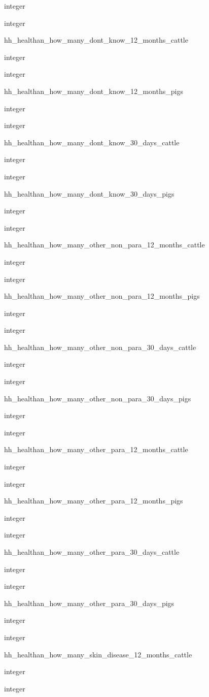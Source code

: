 \documentclass[]{article}
\begin{document}
integer

integer

hh\_healthan\_how\_many\_dont\_know\_12\_months\_cattle

integer

integer

hh\_healthan\_how\_many\_dont\_know\_12\_months\_pigs

integer

integer

hh\_healthan\_how\_many\_dont\_know\_30\_days\_cattle

integer

integer

hh\_healthan\_how\_many\_dont\_know\_30\_days\_pigs

integer

integer

hh\_healthan\_how\_many\_other\_non\_para\_12\_months\_cattle

integer

integer

hh\_healthan\_how\_many\_other\_non\_para\_12\_months\_pigs

integer

integer

hh\_healthan\_how\_many\_other\_non\_para\_30\_days\_cattle

integer

integer

hh\_healthan\_how\_many\_other\_non\_para\_30\_days\_pigs

integer

integer

hh\_healthan\_how\_many\_other\_para\_12\_months\_cattle

integer

integer

hh\_healthan\_how\_many\_other\_para\_12\_months\_pigs

integer

integer

hh\_healthan\_how\_many\_other\_para\_30\_days\_cattle

integer

integer

hh\_healthan\_how\_many\_other\_para\_30\_days\_pigs

integer

integer

hh\_healthan\_how\_many\_skin\_disease\_12\_months\_cattle

integer

integer
\end{document}
